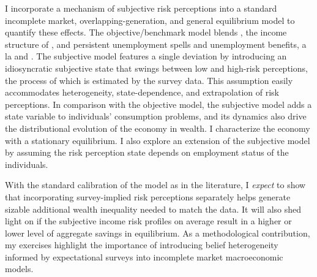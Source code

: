 I incorporate a mechanism of subjective risk perceptions into a standard incomplete market, overlapping-generation, and general equilibrium model to quantify these effects. The objective/benchmark model blends \cite{huggett1996wealth}, the income structure of \cite{carroll1997nature}, and persistent unemployment spells and unemployment benefits, a la \cite{krueger2016macroeconomics} and \cite{carroll2017distribution}. The subjective model features a single deviation by introducing an idiosyncratic subjective state that swings between low and high-risk perceptions, the process of which is estimated by the survey data. This assumption easily accommodates heterogeneity, state-dependence, and extrapolation of risk perceptions. In comparison with the objective model, the subjective model adds a state variable to individuals' consumption problems, and its dynamics also drive the distributional evolution of the economy in wealth. I characterize the economy with a stationary equilibrium. I also explore an extension of the subjective model by assuming the risk perception state depends on employment status of the individuals. 

With the standard calibration of the model as in the literature, I \emph{expect} to show that incorporating survey-implied risk perceptions separately helps generate sizable additional wealth inequality needed to match the data. It will also shed light on if the subjective income risk profiles on average result in a higher or lower level of aggregate savings in equilibrium. As a methodological contribution, my exercises highlight the importance of introducing belief heterogeneity informed by expectational surveys into incomplete market macroeconomic models.  


